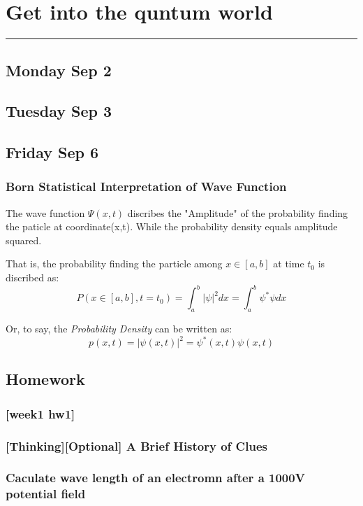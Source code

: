 \section{Get into the quntum world}
\vspace{-15pt}\noindent\rule{\textwidth}{0.1pt}\vspace{-10pt}
    \subsection{\hfill \small Monday Sep 2}
    \subsection{\hfill\small Tuesday Sep 3}
    \subsection{\hfill \small Friday Sep 6}
    \subsubsection*{Born Statistical Interpretation of Wave Function}
    The wave function $\Psi (x,t)$ discribes the "Amplitude" of the probability finding the paticle at coordinate(x,t). While the probability density equals amplitude squared.

    That is, the probability finding the particle among $x\in [a,b]$ at time $t_0$ is discribed as:
    \begin{equation*}
        P(x\in [a,b],t=t_0)=\int^{b}_{a}|\psi|^{2}dx=\int^{b}_{a}\psi^*\psi dx
    \end{equation*}

    Or, to say, the \textit{Probability Density} can be written as:
    \begin{equation*}
        p(x,t)=|\psi(x,t)|^2=\psi^{*}(x,t)\psi(x,t)
    \end{equation*}
    \subsection*{Homework}
        \subsubsection*{[week1 hw1]}
        \subsubsection{[Thinking][Optional] A Brief History of Clues}
        \subsubsection{Caculate wave length of an electromn after a 1000V potential field}
